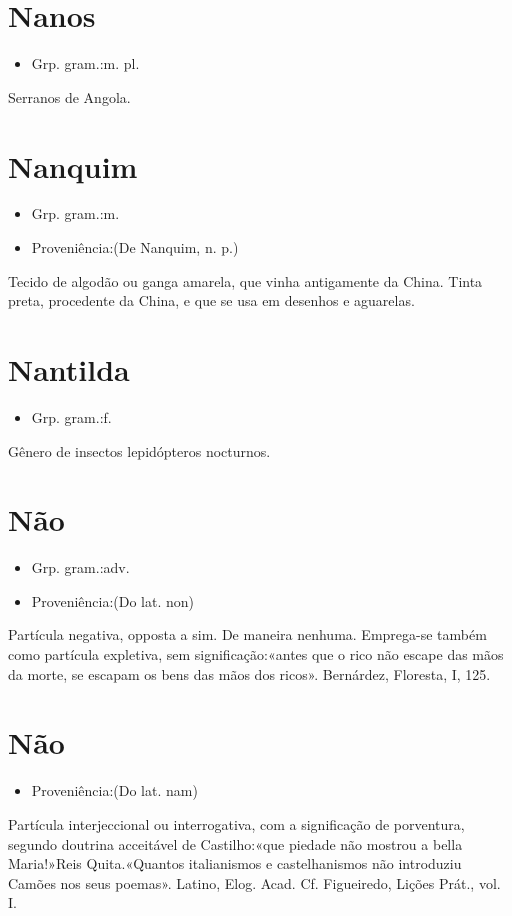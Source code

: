\section{Nanos}
\begin{itemize}
\item {Grp. gram.:m. pl.}
\end{itemize}
Serranos de Angola.
\section{Nanquim}
\begin{itemize}
\item {Grp. gram.:m.}
\end{itemize}
\begin{itemize}
\item {Proveniência:(De \textunderscore Nanquim\textunderscore , n. p.)}
\end{itemize}
Tecido de algodão ou ganga amarela, que vinha antigamente da China.
Tinta preta, procedente da China, e que se usa em desenhos e aguarelas.
\section{Nantilda}
\begin{itemize}
\item {Grp. gram.:f.}
\end{itemize}
Gênero de insectos lepidópteros nocturnos.
\section{Não}
\begin{itemize}
\item {Grp. gram.:adv.}
\end{itemize}
\begin{itemize}
\item {Proveniência:(Do lat. \textunderscore non\textunderscore )}
\end{itemize}
Partícula negativa, opposta a \textunderscore sim\textunderscore .
De maneira nenhuma.
Emprega-se também como partícula expletiva, sem significação:«\textunderscore antes que o rico não escape das mãos da morte, se escapam os bens das mãos dos ricos\textunderscore ». Bernárdez, \textunderscore Floresta\textunderscore , I, 125.
\section{Não}
\begin{itemize}
\item {Proveniência:(Do lat. \textunderscore nam\textunderscore )}
\end{itemize}
Partícula interjeccional ou interrogativa, com a significação de \textunderscore porventura\textunderscore , segundo doutrina acceitável de Castilho:«\textunderscore que piedade não mostrou a bella Maria!\textunderscore »Reis Quita.«\textunderscore Quantos italianismos e castelhanismos não introduziu Camões nos seus poemas\textunderscore ». Latino, \textunderscore Elog. Acad\textunderscore . Cf. Figueiredo, \textunderscore Lições Prát.\textunderscore , vol. I.
